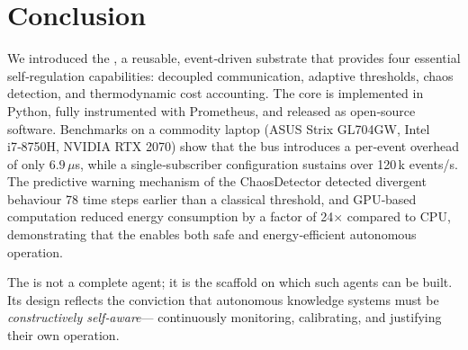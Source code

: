 \section{Conclusion}

We introduced the \Core{}, a reusable, event‑driven substrate that
provides four essential self‑regulation capabilities: decoupled
communication, adaptive thresholds, chaos detection, and thermodynamic
cost accounting.  The core is implemented in Python, fully instrumented
with Prometheus, and released as open‑source software.  Benchmarks on a
commodity laptop (ASUS Strix GL704GW, Intel i7‑8750H, NVIDIA RTX 2070)
show that the bus introduces a per‑event overhead of only $6.9\,\mu$s,
while a single‑subscriber configuration sustains over 120\,k events/s.
The predictive warning mechanism of the ChaosDetector detected divergent
behaviour 78 time steps earlier than a classical threshold, and GPU‑based
computation reduced energy consumption by a factor of 24$\times$ compared
to CPU, demonstrating that the \Core{} enables both safe and
energy‑efficient autonomous operation.

The \Core{} is not a complete agent; it is the scaffold on which such
agents can be built.  Its design reflects the conviction that
autonomous knowledge systems must be \emph{constructively self‑aware}—
continuously monitoring, calibrating, and justifying their own
operation.